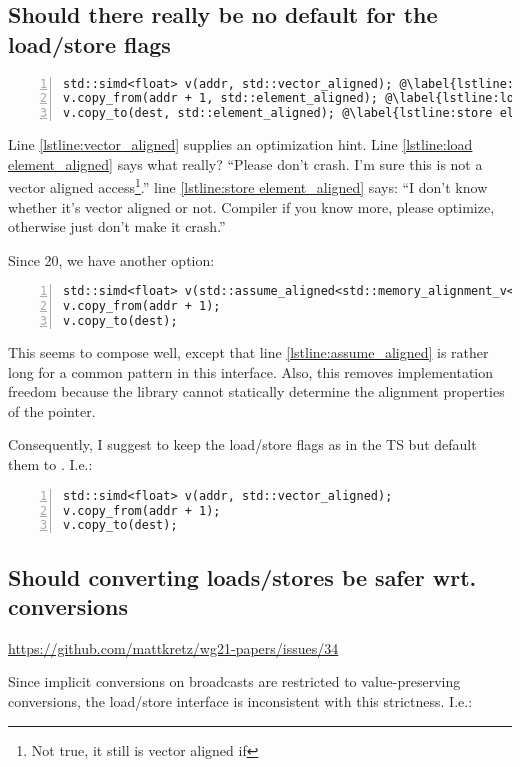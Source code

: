 \subsection{Should there really be no default for the load/store flags}
\begin{lstlisting}[numbers=left]
std::simd<float> v(addr, std::vector_aligned); @\label{lstline:vector_aligned}@
v.copy_from(addr + 1, std::element_aligned); @\label{lstline:load element_aligned}@
v.copy_to(dest, std::element_aligned); @\label{lstline:store element_aligned}@
\end{lstlisting}
Line \ref{lstline:vector_aligned} supplies an optimization hint.
Line \ref{lstline:load element_aligned} says what really?
“Please don't crash.
I'm sure this is not a vector aligned access\footnote{Not true, it still is vector aligned if }.”
line \ref{lstline:store element_aligned} says:
“I don't know whether it's vector aligned or not.
Compiler if you know more, please optimize, otherwise just don't make it crash.”

Since \CC{}20, we have another option:
\begin{lstlisting}[numbers=left]
std::simd<float> v(std::assume_aligned<std::memory_alignment_v<std::simd<float>>>(addr)); @\label{lstline:assume_aligned}@
v.copy_from(addr + 1);
v.copy_to(dest);
\end{lstlisting}
This seems to compose well, except that line \ref{lstline:assume_aligned} is rather long for a common pattern in this interface.
Also, this removes implementation freedom because the library cannot statically determine the alignment properties of the pointer.

Consequently, I suggest to keep the load/store flags as in the TS but default them to .
I.e.:
\begin{lstlisting}[numbers=left]
std::simd<float> v(addr, std::vector_aligned);
v.copy_from(addr + 1);
v.copy_to(dest);
\end{lstlisting}

\subsection{Should converting loads/stores be safer wrt. conversions}
\url{https://github.com/mattkretz/wg21-papers/issues/34}

Since implicit conversions on broadcasts are restricted to value-preserving conversions, the load/store interface is inconsistent with this strictness.
I.e.:

